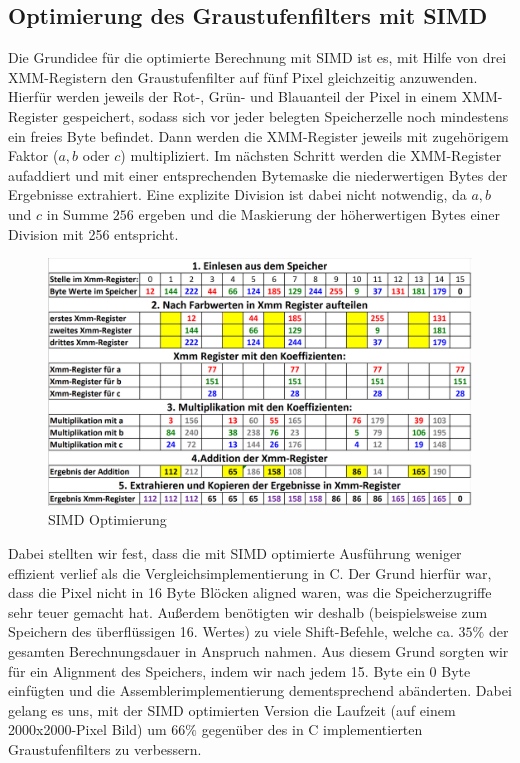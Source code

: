 \documentclass[course=erap]{aspdoc}
\begin{document}
	\subsection{Optimierung des Graustufenfilters mit SIMD}
	Die Grundidee für die optimierte Berechnung mit SIMD ist es, mit Hilfe von drei XMM-Registern den Graustufenfilter auf fünf Pixel gleichzeitig anzuwenden. Hierfür werden jeweils der Rot-, Grün- und Blauanteil der Pixel in einem XMM-Register gespeichert, sodass sich vor jeder belegten Speicherzelle noch mindestens ein freies Byte befindet. Dann werden die XMM-Register jeweils mit zugehörigem Faktor ($a,b$ oder $c$) multipliziert. Im nächsten Schritt werden die XMM-Register aufaddiert und mit einer entsprechenden Bytemaske die niederwertigen Bytes der Ergebnisse extrahiert. Eine explizite Division ist dabei nicht notwendig, da $a,b$ und $c$ in Summe $256$ ergeben und die Maskierung der höherwertigen Bytes einer Division mit 256 entspricht.
    \begin{figure}[H]
			\centering
			\includegraphics[scale=0.46]{Images/SIMDoptimization.png}
			\caption{SIMD Optimierung}
			\label{SimdOptimization}
	\end{figure}
	\noindent
	Dabei stellten wir fest, dass die mit SIMD optimierte Ausführung weniger effizient verlief als die Vergleichsimplementierung in C. Der Grund hierfür war, dass die Pixel nicht in 16 Byte Blöcken aligned waren, was die Speicherzugriffe sehr teuer gemacht hat.
	Außerdem benötigten wir deshalb (beispielsweise zum Speichern des überflüssigen 16. Wertes) zu viele Shift-Befehle, welche ca. $35\%$ der gesamten Berechnungsdauer in Anspruch nahmen. Aus diesem Grund sorgten wir für ein Alignment des Speichers, indem wir nach jedem 15. Byte ein 0 Byte einfügten und die Assemblerimplementierung dementsprechend abänderten. Dabei gelang es uns, mit der SIMD optimierten Version die Laufzeit (auf einem 2000x2000-Pixel Bild) um $66\%$ gegenüber des in C implementierten Graustufenfilters zu verbessern.  
	
\end{document}
